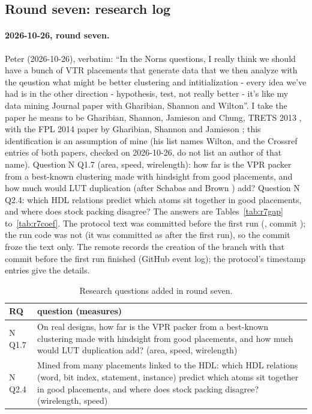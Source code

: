 \subsection{Round seven: research log}
\label{sec:r7-appendix}
\paragraph{2026-10-26, round seven.} Peter (2026-10-26), verbatim: ``In the Norns questions, I really think we should have a bunch of VTR placements that generate data that we then analyze with the qeustion what might be better clustering and intitialization - every idea we've had is in the other direction - hypothesis, test, not really better - it's like my data mining Journal paper with Gharibian, Shannon and Wilton''. I take the paper he means to be Gharibian, Shannon, Jamieson and Chung, TRETS 2013 \cite{Gharibian2013tret}, with the FPL 2014 paper by Gharibian, Shannon and Jamieson \cite{gharibian2014identifying}; this identification is an assumption of mine (his list names Wilton, and the Crossref entries of both papers, checked on 2026-10-26, do not list an author of that name). Question N Q1.7 (area, speed, wirelength): how far is the VPR packer from a best-known clustering made with hindsight from good placements, and how much would LUT duplication (after Schabas and Brown \cite{schabas2003duplication}) add? Question N Q2.4: which HDL relations predict which atoms sit together in good placements, and where does stock packing disagree? The answers are Tables~\ref{tab:r7gap} to~\ref{tab:r7coef}. The protocol text was committed before the first run (, commit ); the run code was not (it was committed as  after the first run), so the commit froze the text only. The remote records the creation of the branch with that commit before the first run finished (GitHub event log); the protocol's timestamp entries give the details.

\begin{table}[t]
\caption{Research questions added in round seven.}
\label{tab:r7rq}
\centering\scriptsize
\begin{tabular}{@{}lp{6.4cm}@{}}
\toprule
RQ & question (measures) \\
\midrule
N Q1.7 & On real designs, how far is the VPR packer from a best-known clustering made with hindsight from good placements, and how much would LUT duplication add? (area, speed, wirelength) \\
N Q2.4 & Mined from many placements linked to the HDL: which HDL relations (word, bit index, statement, instance) predict which atoms sit together in good placements, and where does stock packing disagree? (wirelength, speed) \\
\bottomrule
\end{tabular}
\end{table}

